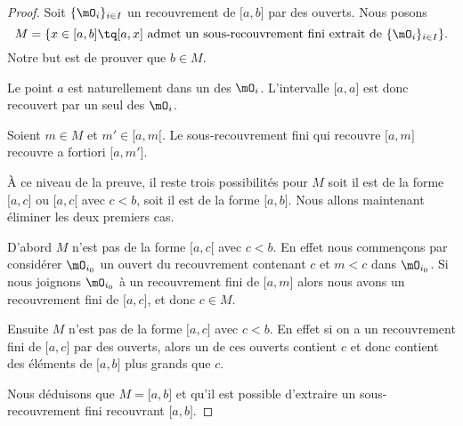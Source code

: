 \begin{proof}
    Soit \( \{ \mO_i \}_{i\in I}\) un recouvrement de \( \mathopen[ a , b \mathclose]\) par des ouverts. Nous posons
    \begin{equation}
        M=\{ x\in\mathopen[ a , b \mathclose]\tq \mathopen[ a , x \mathclose] \text{ admet un sous-recouvrement fini extrait de } \{ \mO_i \}_{i\in I} \}.
    \end{equation}
    Notre but est de prouver que \( b\in M\).
    \begin{subproof}

    \item[\( a\) est dans \( M\)]

        Le point \( a\) est naturellement dans un des \( \mO_i\). L'intervalle \( \mathopen[ a , a \mathclose]\) est donc recouvert par un seul des \( \mO_i\).

    \item[\( M\) est un intervalle]

        Soient \( m\in M\) et \( m'\in\mathopen[ a , m [\). Le sous-recouvrement fini qui recouvre \( \mathopen[ a , m \mathclose]\) recouvre a fortiori \( \mathopen[ a , m' \mathclose]\).

    \item[Les trois possibilités restantes]
        À ce niveau de la preuve, il reste trois possibilités pour \( M\) soit il est de la forme \( \mathopen[ a , c \mathclose]\) ou \( \mathopen[ a , c [\) avec \( c<b\), soit il est de la forme \( \mathopen[ a , b \mathclose]\). Nous allons maintenant éliminer les deux premiers cas.

    \item[Ce que \( M\) n'est pas]

        D'abord \( M\) n'est pas de la forme \( \mathopen[ a , c [\) avec \( c<b\). En effet nous commençons par considérer \( \mO_{i_0}\) un ouvert du recouvrement contenant \( c\) et \( m<c\) dans \( \mO_{i_0}\). Si nous joignons \( \mO_{i_0}\) à un recouvrement fini de \( \mathopen[ a , m \mathclose]\) alors nous avons un recouvrement fini de \( \mathopen[ a , c \mathclose]\), et donc \( c\in M\).

        Ensuite \( M\) n'est pas de la forme \( \mathopen[ a , c \mathclose]\) avec \( c<b\). En effet si on a un recouvrement fini de \( \mathopen[ a , c \mathclose]\) par des ouverts, alors un de ces ouverts contient \( c\) et donc contient des éléments de \( \mathopen[ a , b \mathclose]\) plus grands que \( c\).
    \end{subproof}
    Nous déduisons que \( M=\mathopen[ a , b \mathclose]\) et qu'il est possible d'extraire un sous-recouvrement fini recouvrant \( \mathopen[ a , b \mathclose]\).
\end{proof}

